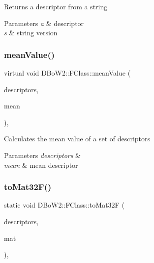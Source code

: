 Returns a descriptor from a string 
\begin{DoxyParams}{Parameters}
{\em a} & descriptor \\
\hline
{\em s} & string version \\
\hline
\end{DoxyParams}
\mbox{\label{class_d_bo_w2_1_1_f_class_a2f5859fa3acdf4f2a8a64d7e09de54ab}} 
\subsubsection{\texorpdfstring{mean\+Value()}{meanValue()}}
{\footnotesize\ttfamily virtual void D\+Bo\+W2\+::\+F\+Class\+::mean\+Value (\begin{DoxyParamCaption}\item[{const std\+::vector$<$ \mbox{\hyperlink{class_d_bo_w2_1_1_f_class_a9c94e662003f61413fd542d67b45c3a9}{p\+Descriptor}} $>$ \&}]{descriptors,  }\item[{T\+Descriptor \&}]{mean }\end{DoxyParamCaption})\hspace{0.3cm}{\ttfamily [private]}, {}}

Calculates the mean value of a set of descriptors 
\begin{DoxyParams}{Parameters}
{\em descriptors} & \\
\hline
{\em mean} & mean descriptor \\
\hline
\end{DoxyParams}
\mbox{\label{class_d_bo_w2_1_1_f_class_a28a6ac7c718818f7a068a4aaae3e3b45}} 
\subsubsection{\texorpdfstring{to\+Mat32\+F()}{toMat32F()}}
{\footnotesize\ttfamily static void D\+Bo\+W2\+::\+F\+Class\+::to\+Mat32F (\begin{DoxyParamCaption}\item[{const std\+::vector$<$ T\+Descriptor $>$ \&}]{descriptors,  }\item[{cv\+::\+Mat \&}]{mat }\end{DoxyParamCaption})\hspace{0.3cm}{\ttfamily [static]}, {\ttfamily [private]}}

